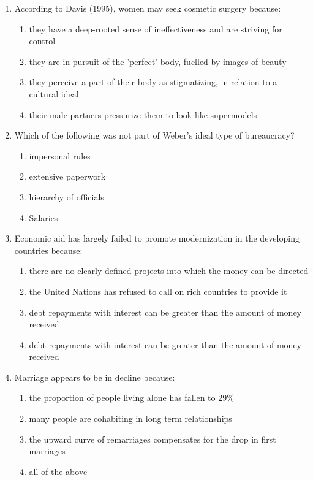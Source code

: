 \documentclass[12pt]{article}
\begin{document}
\begin{enumerate}[label=\arabic*.]
\item According to Davis (1995), women may seek cosmetic surgery because:
\begin{enumerate}[label=(\alph*)]
    \item they have a deep-rooted sense of ineffectiveness and are striving for control
    \item they are in pursuit of the 'perfect' body, fuelled by images of beauty
    \item they perceive a part of their body as stigmatizing, in relation to a cultural ideal
    \item their male partners pressurize them to look like supermodels
\end{enumerate}
\item Which of the following was not part of Weber's ideal type of bureaucracy?
\begin{enumerate}[label=(\alph*)]
    \item impersonal rules
    \item extensive paperwork
    \item hierarchy of officials
    \item Salaries
\end{enumerate}
\item Economic aid has largely failed to promote modernization in the developing countries because:
\begin{enumerate}[label=(\alph*)]
    \item there are no clearly defined projects into which the money can be directed
    \item the United Nations has refused to call on rich countries to provide it
    \item debt repayments with interest can be greater than the amount of money received
    \item debt repayments with interest can be greater than the amount of money received
\end{enumerate}
\item Marriage appears to be in decline because:
\begin{enumerate}[label=(\alph*)]
    \item the proportion of people living alone has fallen to 29\%
    \item many people are cohabiting in long term relationships
    \item the upward curve of remarriages compensates for the drop in first marriages
    \item all of the above
\end{enumerate}

\end{enumerate}
\end{document}

